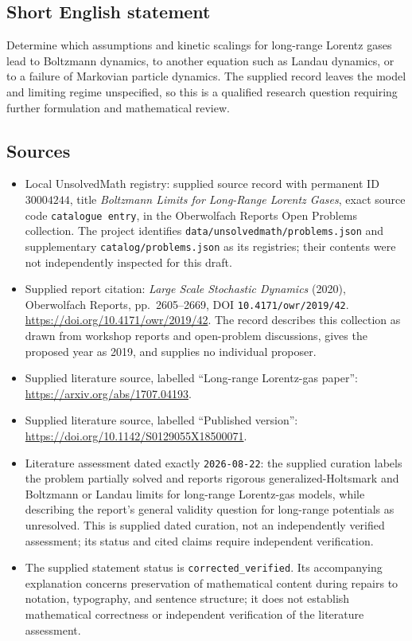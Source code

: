 \documentclass[11pt]{article}
\begin{document}
\subsection{Short English statement}
Determine which assumptions and kinetic scalings for long-range Lorentz gases lead to Boltzmann dynamics, to another equation such as Landau dynamics, or to a failure of Markovian particle dynamics. The supplied record leaves the model and limiting regime unspecified, so this is a qualified research question requiring further formulation and mathematical review.
\subsection{Sources}
\begin{itemize}
\item Local UnsolvedMath registry: supplied source record with permanent ID \(30004244\), title \emph{Boltzmann Limits for Long-Range Lorentz Gases}, exact source code \texttt{catalogue entry}, in the Oberwolfach Reports Open Problems collection. The project identifies \texttt{data/unsolvedmath/problems.json} and supplementary \texttt{catalog/problems.json} as its registries; their contents were not independently inspected for this draft.
\item Supplied report citation: \emph{Large Scale Stochastic Dynamics} (2020), Oberwolfach Reports, pp.\ 2605--2669, DOI \texttt{10.4171/owr/2019/42}. \url{https://doi.org/10.4171/owr/2019/42}. The record describes this collection as drawn from workshop reports and open-problem discussions, gives the proposed year as 2019, and supplies no individual proposer.
\item Supplied literature source, labelled ``Long-range Lorentz-gas paper'': \url{https://arxiv.org/abs/1707.04193}.
\item Supplied literature source, labelled ``Published version'': \url{https://doi.org/10.1142/S0129055X18500071}.
\item Literature assessment dated exactly \texttt{2026-08-22}: the supplied curation labels the problem partially solved and reports rigorous generalized-Holtsmark and Boltzmann or Landau limits for long-range Lorentz-gas models, while describing the report's general validity question for long-range potentials as unresolved. This is supplied dated curation, not an independently verified assessment; its status and cited claims require independent verification.
\item The supplied statement status is \texttt{corrected\_verified}. Its accompanying explanation concerns preservation of mathematical content during repairs to notation, typography, and sentence structure; it does not establish mathematical correctness or independent verification of the literature assessment.
\end{itemize}
\end{document}
